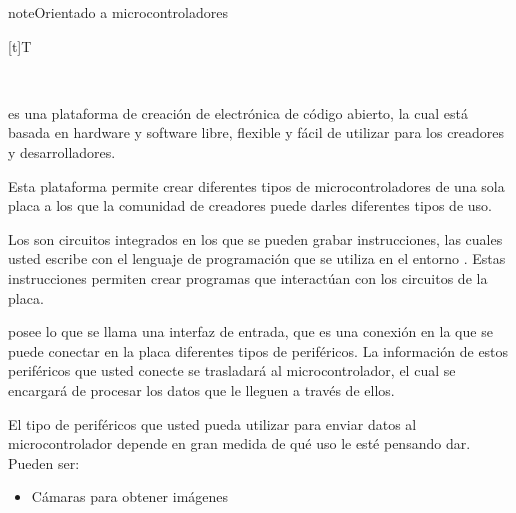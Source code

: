 \documentclass[letterpaper,10pt,spanish]{sphinxmanual}
\let\sphinxpxdimen\pdfpxdimen\else\newdimen\sphinxpxdimen
\begin{document}
\begin{sphinxadmonition}{note}{Orientado a micro\sphinxhyphen{}controladores}


\begin{savenotes}\sphinxattablestart
\sphinxthistablewithglobalstyle
\centering
\begin{tabulary}{\linewidth}[t]{T}
\sphinxtoprule
\sphinxtableatstartofbodyhook

\begin{sphinxfigure-in-table}
\centering
\capstart
\noindent\sphinxincludegraphics[width=500\sphinxpxdimen]{{image072}.png}
\label{\detokenize{1_guias/10informatica/G1004:id8}}\end{sphinxfigure-in-table}\relax
\\
\sphinxbottomrule
\end{tabulary}
\sphinxtableafterendhook\par
\sphinxattableend\end{savenotes}

\sphinxAtStartPar
{} es una plataforma de creación de electrónica de código abierto, la cual está basada en hardware y software libre, flexible y fácil de utilizar para los creadores y desarrolladores.

\sphinxAtStartPar
Esta plataforma permite crear diferentes tipos de micro\sphinxhyphen{}controladores de una sola placa a los que la comunidad de creadores puede darles diferentes tipos de uso.

\sphinxAtStartPar
Los  son circuitos integrados en los que se pueden grabar instrucciones, las cuales usted escribe con el lenguaje de programación que se utiliza en el entorno . Estas instrucciones permiten crear programas que interactúan con los circuitos de la placa.

\sphinxAtStartPar
{} posee lo que se llama una interfaz de entrada, que es una conexión en la que se puede conectar en la placa diferentes tipos de periféricos. La información de estos periféricos que usted conecte se trasladará al micro\sphinxhyphen{}controlador, el cual se encargará de procesar los datos que le lleguen a través de ellos.

\sphinxAtStartPar
El tipo de periféricos que usted pueda utilizar para enviar datos al micro\sphinxhyphen{}controlador depende en gran medida de qué uso le esté pensando dar. Pueden ser:
\begin{itemize}
\item {} 
\sphinxAtStartPar
Cámaras para obtener imágenes


\end{itemize}
\end{sphinxadmonition}
\end{document}
